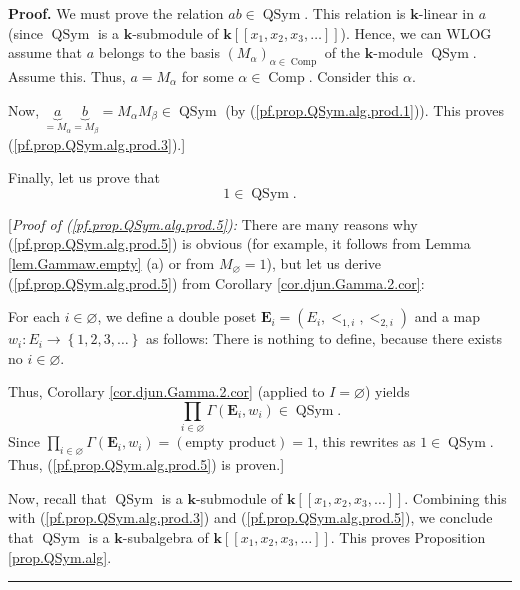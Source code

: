 \documentclass[numbers=enddot,12pt,final,onecolumn,notitlepage,abstracton]{scrartcl}
\theoremstyle{definition}
\newenvironment{proof}[1][Proof]{\noindent\textbf{#1.} }{\ \rule{0.5em}{0.5em}}
\let\prodnonlimits\prod
\renewcommand{\prod}{\prodnonlimits\limits}
\newenvironment{verlong}{}{}
\begin{document}
\begin{verlong}
\begin{footnotesize}
\begin{proof}
We must prove the relation $ab\in\operatorname*{QSym}$. This relation is
$\mathbf{k}$-linear in $a$ (since $\operatorname*{QSym}$ is a $\mathbf{k}%
$-submodule of $\mathbf{k}\left[  \left[  x_{1},x_{2},x_{3},\ldots\right]
\right]  $). Hence, we can WLOG assume that $a$ belongs to the basis $\left(
M_{\alpha}\right)  _{\alpha\in\operatorname*{Comp}}$ of the $\mathbf{k}%
$-module $\operatorname*{QSym}$. Assume this. Thus, $a=M_{\alpha}$ for some
$\alpha\in\operatorname*{Comp}$. Consider this $\alpha$.

Now, $\underbrace{a}_{=M_{\alpha}}\underbrace{b}_{=M_{\beta}}=M_{\alpha
}M_{\beta}\in\operatorname*{QSym}$ (by (\ref{pf.prop.QSym.alg.prod.1})). This
proves (\ref{pf.prop.QSym.alg.prod.3}).]

Finally, let us prove that%
\begin{equation}
1\in\operatorname*{QSym}. \label{pf.prop.QSym.alg.prod.5}%
\end{equation}


[\textit{Proof of (\ref{pf.prop.QSym.alg.prod.5}):} There are many reasons why
(\ref{pf.prop.QSym.alg.prod.5}) is obvious (for example, it follows from Lemma
\ref{lem.Gammaw.empty} (a) or from $M_{\varnothing}=1$), but let us derive
(\ref{pf.prop.QSym.alg.prod.5}) from Corollary \ref{cor.djun.Gamma.2.cor}:

For each $i\in\varnothing$, we define a double poset $\mathbf{E}_{i}=\left(
E_{i},<_{1,i},<_{2,i}\right)  $ and a map $w_{i}:E_{i}\rightarrow\left\{
1,2,3,\ldots\right\}  $ as follows: There is nothing to define, because there
exists no $i\in\varnothing$.

Thus, Corollary \ref{cor.djun.Gamma.2.cor} (applied to $I=\varnothing$)
yields
\[
\prod_{i\in\varnothing}\Gamma\left(  \mathbf{E}_{i},w_{i}\right)
\in\operatorname*{QSym}.
\]
Since $\prod_{i\in\varnothing}\Gamma\left(  \mathbf{E}_{i},w_{i}\right)
=\left(  \text{empty product}\right)  =1$, this rewrites as $1\in
\operatorname*{QSym}$. Thus, (\ref{pf.prop.QSym.alg.prod.5}) is proven.]

Now, recall that $\operatorname*{QSym}$ is a $\mathbf{k}$-submodule of
$\mathbf{k}\left[  \left[  x_{1},x_{2},x_{3},\ldots\right]  \right]  $.
Combining this with (\ref{pf.prop.QSym.alg.prod.3}) and
(\ref{pf.prop.QSym.alg.prod.5}), we conclude that $\operatorname*{QSym}$ is a
$\mathbf{k}$-subalgebra of $\mathbf{k}\left[  \left[  x_{1},x_{2},x_{3}%
,\ldots\right]  \right]  $. This proves Proposition \ref{prop.QSym.alg}.
\end{proof}


\end{footnotesize}
\end{verlong}
\end{document}
